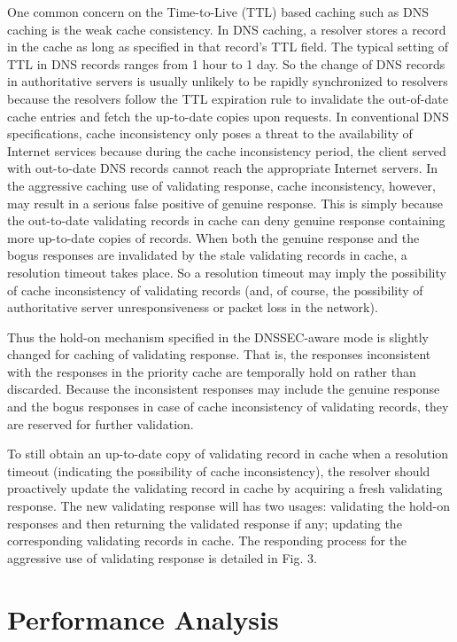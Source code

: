 \documentclass[conference]{IEEEtran}
\begin{document}
One common concern on the Time-to-Live (TTL) based caching such as DNS caching is the weak cache consistency. In DNS caching, a resolver stores a record in the cache as long as specified in that record's TTL field. The typical setting of TTL in DNS records ranges from 1 hour to 1 day. So the change of DNS records in authoritative servers is usually unlikely to be rapidly synchronized to resolvers because the resolvers follow the TTL expiration rule to invalidate the out-of-date cache entries and fetch the up-to-date copies upon requests. In conventional DNS specifications, cache inconsistency only poses a threat to the availability of Internet services because during the cache inconsistency period, the client served with out-to-date DNS records cannot reach the appropriate Internet servers. In the aggressive caching use of validating response, cache inconsistency, however, may result in a serious false positive of genuine response. This is simply because the out-to-date validating records in cache can deny genuine response containing more up-to-date copies of records. When both the genuine response and the bogus responses are invalidated by the stale validating records in cache, a resolution timeout takes place. So a resolution timeout may imply the possibility of cache inconsistency of validating records (and, of course, the possibility of authoritative server unresponsiveness or packet loss in the network).


Thus the hold-on mechanism specified in the DNSSEC-aware mode is slightly changed for caching of validating response. That is, the responses inconsistent with the responses in the priority cache are temporally hold on rather than discarded. Because the inconsistent responses may include the genuine response and the bogus responses in case of cache inconsistency of validating records, they are reserved for further validation.


To still obtain an up-to-date copy of validating record in cache when a resolution timeout (indicating the possibility of cache inconsistency), the resolver should proactively update the validating record in cache by acquiring a fresh validating response. The new validating response will has two usages: validating the hold-on responses and then returning the validated response if any; updating the corresponding validating records in cache. The responding process for the aggressive use of validating response is detailed in Fig. 3.


\section{Performance Analysis}
\end{document}
